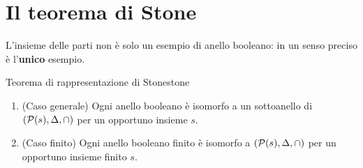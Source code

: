 \section{Il teorema di Stone}\label{sec:stone}

L'insieme delle parti non è solo un esempio di anello booleano: in un senso preciso è l'\textbf{unico} esempio.

\begin{concetto}
\begin{Teorema}{Teorema di rappresentazione di Stone}{stone}
    \begin{prerequisiti}
    \end{prerequisiti}
    \senzadim
    \begin{enumerate}
        \item (Caso generale) Ogni anello booleano è isomorfo a un sottoanello di $(\mathcal{P}(s), \Delta, \cap)$ per un opportuno insieme $s$.
        \item (Caso finito) Ogni anello booleano finito è isomorfo a $(\mathcal{P}(s), \Delta, \cap)$ per un opportuno insieme finito $s$.
    \end{enumerate}
\end{Teorema}
\end{concetto}

